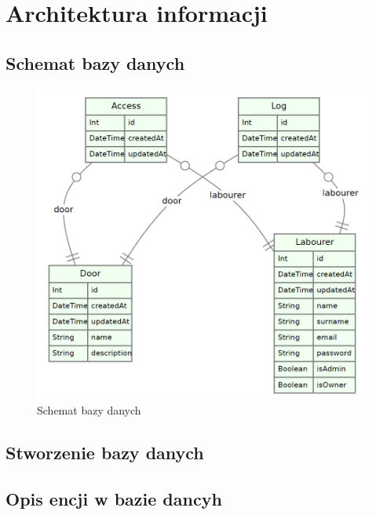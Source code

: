\section{Architektura informacji}
\subsection{Schemat bazy danych}
\begin{figure}[h]
    \centering
    \includegraphics[scale=0.6]{photos/schemat_bazy_danych.png}
    \caption{Schemat bazy danych}
    \label{fig:erd}
\end{figure}
\newpage
\subsection{Stworzenie bazy danych}



\subsection{Opis encji w bazie dancyh}

